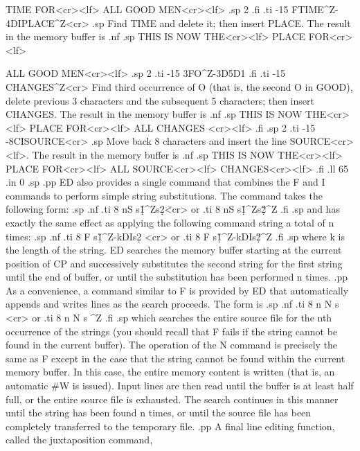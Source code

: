 TIME FOR<cr><lf>           
ALL GOOD MEN<cr><lf>       
.sp 2
.fi
.ti -15
FTIME^Z-4DIPLACE^Z<cr>  
.sp
Find TIME and delete it; then insert PLACE.  The result in the memory 
buffer is     
.nf
.sp                                                
THIS IS NOW THE<cr><lf>   
PLACE    FOR<cr><lf>      
                          
ALL GOOD MEN<cr><lf>      
.sp 2
.ti -15
3FO^Z-3D5D1             
.fi
.ti -15
CHANGES^Z<cr>  Find  third  occurrence of O (that is, the 
second O in GOOD), 
delete previous 3 characters and the subsequent 5 characters; then insert 
CHANGES.  The result in the memory buffer is
.nf
.sp
THIS IS NOW THE<cr><lf>   
PLACE FOR<cr><lf>         
ALL CHANGES   <cr><lf>    
.fi
.sp 2
.ti -15
-8CISOURCE<cr>          
.sp
Move back 8 characters and insert the line SOURCE<cr><lf>.  The result in the
memory buffer is
.nf
.sp     
THIS IS NOW THE<cr><lf>   
PLACE FOR<cr><lf>         
ALL SOURCE<cr><lf>        
   CHANGES<cr><lf>                
.fi
.ll 65
.in 0
.sp
.pp
ED also provides a single command that combines the F and I 
commands to perform simple string substitutions.  The command 
takes the following form:
.sp
.nf
.ti 8
nS  s\d1\u^Zs\d2\u <cr>
or
.ti 8
nS s\d1\u^Zs\d2\u  ^Z
.fi
.sp
and has exactly the same effect as applying the following command 
string a total of n times:
.sp
.nf
.ti 8
F s\d1\u^Z-kDIs\d2 <cr>
or
.ti 8
F s\d1\u^Z-kDIs\d2\u ^Z
.fi
.sp
where k is the length of the string.  ED searches the 
memory buffer starting at the current position of CP and 
successively substitutes the second string for the first string 
until the end of buffer, or until the substitution has been 
performed n times.
.pp
As a convenience, a command similar to F is provided by ED that
automatically appends and writes lines as the search proceeds.  
The form is
.sp
.nf
.ti 8
n N s <cr>
or
.ti 8
n N s ^Z
.fi
.sp
which searches the entire source file for the nth occurrence of 
the strings (you should recall that F fails if the string 
cannot be found in the current buffer).  The operation of the N 
command is precisely the same as F except in the case that the 
string cannot be found within the current memory buffer.  In this 
case, the entire memory content is written (that is, an automatic #W 
is issued).  Input lines are then read until the buffer is at 
least half full, or the entire source file is exhausted.  The 
search continues in this manner until the string has been found n 
times, or until the source file has been completely transferred to 
the temporary file.
.pp
A final line editing function, called the juxtaposition command, 
